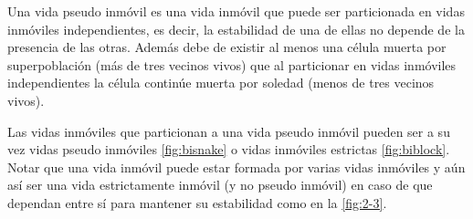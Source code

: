 \documentclass[../proyecto.tex]{memoir}
\begin{document}
\begin{defi}
Una vida pseudo inmóvil es una vida inmóvil que puede ser particionada en vidas inmóviles independientes, es decir, la estabilidad de una de ellas no depende de la presencia de las otras. Además debe de existir al menos una célula muerta por superpoblación (más de tres vecinos vivos) que al particionar en vidas inmóviles independientes la célula continúe muerta por soledad (menos de tres vecinos vivos).
\end{defi}

Las vidas inmóviles que particionan a una vida pseudo inmóvil pueden ser a su vez vidas pseudo inmóviles \autoref{fig:bisnake} o vidas inmóviles estrictas \autoref{fig:biblock}. Notar que una vida inmóvil puede estar formada por varias vidas inmóviles y aún así ser una vida estrictamente inmóvil (y no pseudo inmóvil) en caso de que dependan entre sí para mantener su estabilidad como en la \autoref{fig:2-3}.
\end{document}
